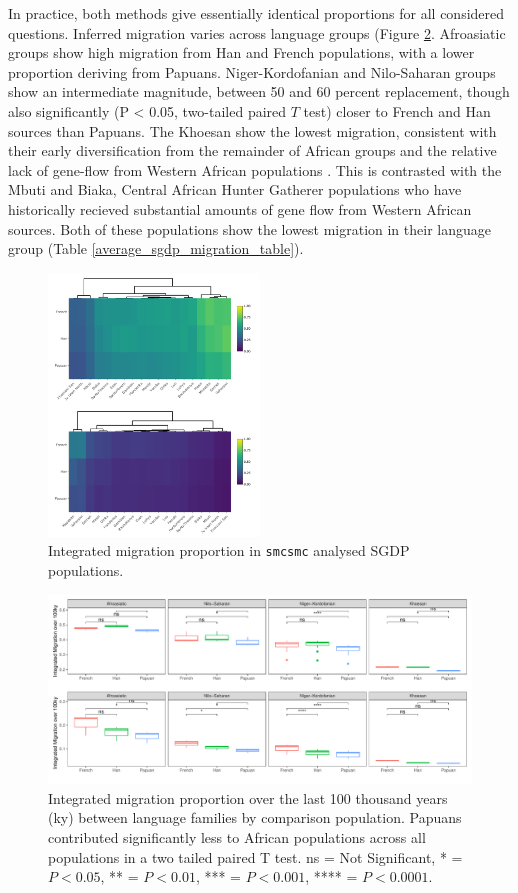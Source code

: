 \documentclass{article}
\begin{document}
In practice, both methods give essentially identical proportions for all considered questions. Inferred migration varies across language groups (Figure \ref{averages_of_sgdp}. Afroasiatic groups show high migration from Han and French populations, with a lower proportion deriving from Papuans. Niger-Kordofanian and Nilo-Saharan groups show an intermediate magnitude, between 50 and 60 percent replacement, though also significantly (P < 0.05, two-tailed paired $T$ test) closer to French and Han sources than Papuans. The Khoesan show the lowest migration, consistent with their early diversification from the remainder of African groups and the relative lack of gene-flow from Western African populations \cite{Lipson2019}. This is contrasted with the Mbuti and Biaka, Central African Hunter Gatherer populations who have historically recieved substantial amounts of gene flow from Western African sources. Both of these populations show the lowest migration in their language group (Table \ref{average_sgdp_migration_table}). 

\begin{figure}
	\centering
	\includegraphics[width=0.5\textwidth]{../plot/sgdp_heatmap_figure.pdf}
	\caption{Integrated migration proportion in {\tt smcsmc} analysed SGDP populations.}
	\label{sgdp_heatmap}
\end{figure}

\begin{figure}
	\centering
	\includegraphics[width=\textwidth]{../plot/mig/sgdp_averages.pdf}
	\caption{Integrated migration proportion over the last 100 thousand years (ky) between language families by comparison population. Papuans contributed significantly less to African populations across all populations in a two tailed paired T test. ns = Not Significant, * = $P<0.05$, ** = $P<0.01$, *** = $P<0.001$, **** = $P<0.0001$.}
	\label{averages_of_sgdp}
\end{figure}
\end{document}
